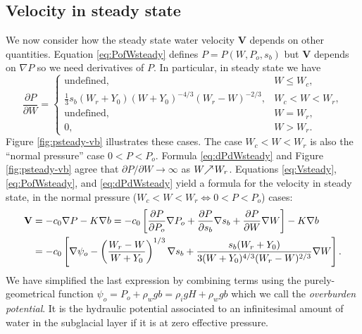 \documentclass[11pt,final]{amsart}%
\newcommand\bV{\mathbf{V}}
\newcommand{\grad}{\nabla}
\begin{document}
\subsection*{Velocity in steady state}  We now consider how the steady state water velocity $\bV$ depends on other quantities.  Equation \eqref{eq:PofWsteady} defines $P=P(W,P_o,s_b)$ but $\bV$ depends on $\grad P$ so we need derivatives of $P$.  In particular, in steady state we have
\begin{equation}
\frac{\partial P}{\partial W} =
    \begin{cases}
      \text{undefined}, & W \le W_c, \\
      \frac{1}{3} s_b (W_r + Y_0) (W+Y_0)^{-4/3} (W_r - W)^{-2/3}, & W_c < W < W_r, \\
      \text{undefined}, & W = W_r, \\
      0, & W > W_r.
    \end{cases}  \label{eq:dPdWsteady}
\end{equation}
Figure \ref{fig:psteady-vb} illustrates these cases.  The case $W_c < W < W_r$ is also the ``normal pressure'' case $0 < P < P_o$.  Formula \eqref{eq:dPdWsteady} and Figure \ref{fig:psteady-vb} agree that $\partial P / \partial W \to \infty$ as $W \!\!\nearrow\! W_r$.  Equations \eqref{eq:Vsteady}, \eqref{eq:PofWsteady}, and \eqref{eq:dPdWsteady} yield a formula for the velocity in steady state, in the normal pressure ($W_c < W < W_r \iff 0 < P < P_o$) cases:
\begin{align}
\bV &= - c_0 \grad P - K \grad b = - c_0 \left[\frac{\partial P}{\partial P_o} \grad P_o + \frac{\partial P}{\partial s_b} \grad s_b + \frac{\partial P}{\partial W} \grad W\right] - K \grad b  \notag \\
    &= - c_0 \left[\grad \psi_o - \left(\frac{W_r - W}{W+Y_0}\right)^{1/3} \grad s_b + \frac{s_b (W_r + Y_0)}{3  (W+Y_0)^{4/3} (W_r - W)^{2/3}} \grad W\right]. \label{eq:Vsteadyexpand}
\end{align}
We have simplified the last expression by combining terms using the purely-geometrical function $\psi_o = P_o + \rho_w g b = \rho_i g H + \rho_w g b$ which we call the \emph{overburden potential}.  It is the hydraulic potential associated to an infinitesimal amount of water in the subglacial layer if it is at zero effective pressure.
\end{document}
